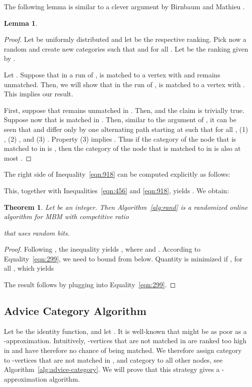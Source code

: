 \documentclass[a4paper]{article}
\newtheorem{theorem}{Theorem}
\newtheorem{lemma}{Lemma}
\begin{document}
The following lemma is similar to a clever argument by Birnbaum and Mathieu \cite{bm08}.
\begin{lemma} \label{lem:birnbaum-mathieu}

\end{lemma}
\begin{proof}
 Let  be uniformly distributed and let  be the respective ranking. Pick now a random
  and create new categories  such that  and for all
 . Let  be the ranking given by .

 Let . Suppose that in a run of ,  is matched
 to a vertex  with  and  remains unmatched. Then, we will show that
 in the run of ,  is matched to a vertex  with . This implies
 our result.

 First, suppose that  remains unmatched in . Then, 
 and the claim is trivially true. Suppose now that  is matched in . Then, similar to
 the argument of \cite{bm08}, it can be seen that  and  differ only by
 one alternating path  starting at  such that for all ,
  (1) ,
  (2) , and
  (3) .
Property (3) implies . Thus if the category  of the node that  is matched
to in  is , then the category  of the node that  is matched to in  is
also at most .
\end{proof}


The right side of Inequality~\ref{eqn:918} can be computed explicitly as follows:

This, together with Inequalities~\ref{eqn:456} and \ref{eqn:918}, yields .
We obtain:
\begin{theorem}\label{thm:rand}
 Let  be an integer. Then Algorithm~\ref{alg:rand} is a randomized online algorithm for
 \textsc{MBM} with competitive ratio
 
 that uses  random bits.
\end{theorem}
\begin{proof}
 Following \cite{bm08}, the inequality  yields
 ,
 where  and . According to Equality~\ref{eqn:299},
 we need to bound  from below. Quantity  is minimized if ,
 for all , which yields
 
 The result follows by plugging  into Equality~\ref{eqn:299}.
\end{proof}


\subsection{Advice Category Algorithm}
Let  be the identity function, and let . It is well-known
that  might be as poor as a -approximation. Intuitively, -vertices that are not matched
in  are ranked too high in  and have therefore no chance of being matched. We therefore assign
category  to -vertices that are not matched in , and category  to all other nodes, see
Algorithm~\ref{alg:advice-category}. We will prove that this strategy gives a -approximation algorithm.
\end{document}
